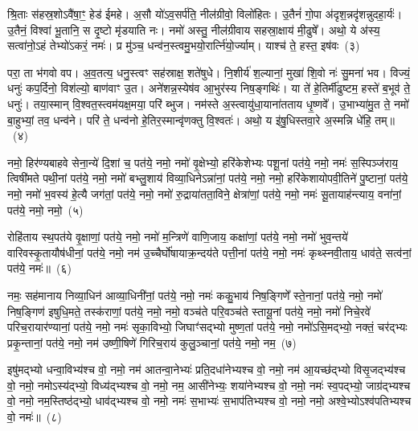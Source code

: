 श्रि॒ताः स॑हस्र॒शो\-ऽवै॑षा॒ꣳ॒ हेड॑ ईमहे। अ॒सौ यो॑\-ऽव॒सर्प॑ति॒ नील॑ग्रीवो॒ विलो॑हितः। उ॒तैनं॑ गो॒पा अ॑दृश॒न्नदृ॑शन्नुदहा॒र्यः॑। उ॒तैनं॒ विश्वा॑ भू॒तानि॒ स दृ॒ष्टो मृ॑डयाति नः। नमो॑ अस्तु॒ नील॑ग्रीवाय सहस्रा॒क्षाय॑ मी॒ढुषे᳚। अथो॒ ये अ॑स्य॒ सत्वा॑नो॒\-ऽहं तेभ्यो॑\-ऽकरं॒ नमः॑। प्र मु॑ञ्च॒ धन्व॑न॒स्त्वमु॒भयो॒रार्त्नि॑यो॒र्ज्याम्। याश्च॑ ते॒ हस्त॒ इष॑वः~(३)\ip

परा॒ ता भ॑गवो वप। अ॒व॒तत्य॒ धनु॒स्त्वꣳ सह॑स्राक्ष॒ शते॑षुधे। नि॒शीर्य॑ श॒ल्यानां॒ मुखा॑ शि॒वो नः॑ सु॒मना॑ भव। विज्यं॒ धनुः॑ कप॒र्दिनो॒ विश॑ल्यो॒ बाण॑वाꣳ उ॒त। अने॑शन्न॒स्येष॑व आ॒भुर॑स्य निष॒ङ्गथिः॑। या ते॑ हे॒तिर्मी॑ढुष्टम॒ हस्ते॑ ब॒भूव॑ ते॒ धनुः॑। तया॒स्मान् वि॒श्वत॒स्त्वम॑यक्ष॒मया॒ परि॑ ब्भुज। नम॑स्ते अ॒स्त्वायु॑धा॒याना॑तताय धृ॒ष्णवे᳚। उ॒भाभ्या॑मु॒त ते॒ नमो॑ बा॒हुभ्यां॒ तव॒ धन्व॑ने। परि॑ ते॒ धन्व॑नो हे॒तिर॒स्मान्वृ॑णक्तु वि॒श्वतः॑। अथो॒ य इ॑षु॒धिस्तवा॒रे अ॒स्मन्नि धे॑हि॒ तम्॥~(४)\ip

{\anuvakamend[{हस्ते॑ दि॒क्ष्विष॑व उ॒भाभ्यां॒ द्वाविꣳ॑शतिश्च}]}

नमो॒ हिर॑ण्यबाहवे सेना॒न्ये॑ दि॒शां च॒ पत॑ये॒ नमो॒ नमो॑ वृ॒क्षेभ्यो॒ हरि॑केशेभ्यः पशू॒नां पत॑ये॒ नमो॒ नमः॑ स॒स्पिञ्ज॑राय॒ त्विषी॑मते पथी॒नां पत॑ये॒ नमो॒ नमो॑ बभ्लु॒शाय॑ विव्या॒धिने\-ऽन्ना॑नां॒ पत॑ये॒ नमो॒ नमो॒ हरि॑केशायोपवी॒तिने॑ पु॒ष्टानां॒ पत॑ये॒ नमो॒ नमो॑ भ॒वस्य॑ हे॒त्यै जग॑तां॒ पत॑ये॒ नमो॒ नमो॑ रु॒द्राया॑तता॒विने॒ क्षेत्रा॑णां॒ पत॑ये॒ नमो॒ नमः॑ सू॒तायाह॑न्त्याय॒ वना॑नां॒ पत॑ये॒ नमो॒ नमो॒~(५)\ip

रोहि॑ताय स्थ॒पत॑ये वृ॒क्षाणां॒ पत॑ये॒ नमो॒ नमो॑ म॒न्त्रिणे॑ वाणि॒जाय॒ कक्षा॑णां॒ पत॑ये॒ नमो॒ नमो॑ भुव॒न्तये॑ वारिवस्कृ॒तायौष॑धीनां॒ पत॑ये॒ नमो॒ नम॑ उ॒च्चैर्घो॑षायाक्र॒न्दय॑ते पत्ती॒नां पत॑ये॒ नमो॒ नमः॑ कृथ्स्नवी॒ताय॒ धाव॑ते॒ सत्व॑नां॒ पत॑ये॒ नमः॑॥~(६)\ip

{\anuvakamend[{वना॑नां॒ पत॑ये॒ नमो॒ नम॒ एका॒न्नत्रि॒ꣳ॒शच्च॑}]}

नमः॒ सह॑मानाय निव्या॒धिन॑ आव्या॒धिनी॑नां॒ पत॑ये॒ नमो॒ नमः॑ ककु॒भाय॑ निष॒ङ्गिणे᳚ स्ते॒नानां॒ पत॑ये॒ नमो॒ नमो॑ निष॒ङ्गिण॑ इषुधि॒मते॒ तस्क॑राणां॒ पत॑ये॒ नमो॒ नमो॒ वञ्च॑ते परि॒वञ्च॑ते स्तायू॒नां पत॑ये॒ नमो॒ नमो॑ निचे॒रवे॑ परिच॒रायार॑ण्यानां॒ पत॑ये॒ नमो॒ नमः॑ सृका॒विभ्यो॒ जिघाꣳ॑सद्भ्यो मुष्ण॒तां पत॑ये॒ नमो॒ नमो॑\-ऽसि॒मद्भ्यो॒ नक्तं॒ चर॑द्भ्यः प्रकृ॒न्तानां॒ पत॑ये॒ नमो॒ नम॑ उष्णी॒षिणे॑ गिरिच॒राय॑ कुलु॒ञ्चानां॒ पत॑ये॒ नमो॒ नम॒~(७)\ip

इषु॑मद्भ्यो धन्वा॒विभ्य॑श्च वो॒ नमो॒ नम॑ आतन्वा॒नेभ्यः॑ प्रति॒दधा॑नेभ्यश्च वो॒ नमो॒ नम॑ आ॒यच्छ॑द्भ्यो विसृ॒जद्भ्य॑श्च वो॒ नमो॒ नमो\-ऽस्य॑द्भ्यो॒ विध्य॑द्भ्यश्च वो॒ नमो॒ नम॒ आसी॑नेभ्यः॒ शया॑नेभ्यश्च वो॒ नमो॒ नमः॑ स्व॒पद्भ्यो॒ जाग्र॑द्भ्यश्च वो॒ नमो॒ नम॒स्तिष्ठ॑द्भ्यो॒ धाव॑द्भ्यश्च वो॒ नमो॒ नमः॑ स॒भाभ्यः॑ स॒भाप॑तिभ्यश्च वो॒ नमो॒ नमो॒ अश्वे॒भ्यो\-ऽश्व॑पतिभ्यश्च वो॒ नमः॑॥~(८)\ip

